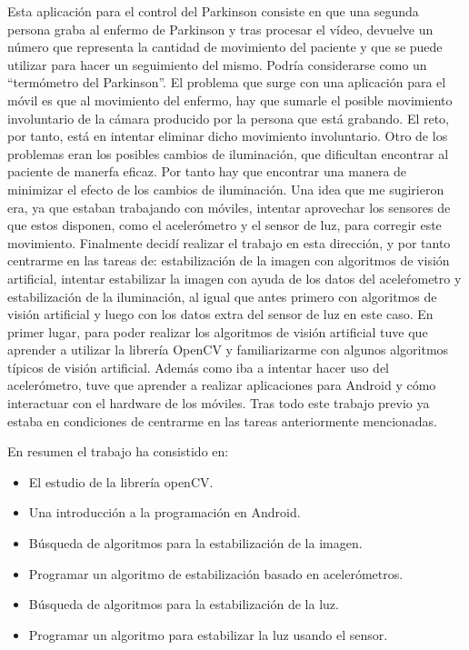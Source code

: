 \documentclass[a4paper,openright, 12pt]{book}
\begin{document}
Esta aplicación para el control del Parkinson consiste en que una segunda persona graba al enfermo de Parkinson y tras procesar el vídeo, devuelve un número que representa la cantidad de movimiento del paciente y que se puede utilizar para hacer un seguimiento del mismo. Podría considerarse como un ``termómetro del Parkinson''. El problema que surge con una aplicación para el móvil es que al movimiento del enfermo, hay que sumarle el posible movimiento involuntario de la cámara producido por la persona que está grabando. El reto, por tanto, está en intentar eliminar dicho movimiento involuntario. Otro de los problemas eran los posibles cambios de iluminación, que dificultan encontrar al paciente de manerfa eficaz. Por tanto hay que encontrar una manera de minimizar el efecto de los cambios de iluminación.
Una idea que me sugirieron era, ya que estaban trabajando con móviles, intentar aprovechar los sensores de que estos disponen, como el acelerómetro y el sensor de luz, para corregir este  movimiento.
\newpage
\thispagestyle{empty} 
Finalmente decidí realizar el trabajo en esta dirección, y por tanto centrarme en las tareas de: estabilización de la imagen con algoritmos de visión artificial, intentar estabilizar la imagen con ayuda de los datos del aceleŕometro y estabilización de la iluminación, al igual que antes primero con algoritmos de visión artificial y luego con los datos extra del sensor de luz en este caso.
En primer lugar, para poder realizar los algoritmos de visión artificial tuve que aprender a utilizar la librería OpenCV\cite{opencvrefman} y familiarizarme con algunos algoritmos típicos de visión artificial. Además como iba a intentar hacer uso del acelerómetro, tuve que aprender a realizar aplicaciones para Android y cómo interactuar con el hardware de los móviles. Tras todo este trabajo previo ya estaba en condiciones de centrarme en las tareas anteriormente mencionadas.

En resumen el trabajo ha consistido en:
\begin{itemize}
\item El estudio de la librería openCV.
\item Una introducción a la programación en Android.
\item Búsqueda de algoritmos para la estabilización de la imagen.
\item Programar un algoritmo de estabilización basado en acelerómetros.
\item Búsqueda de algoritmos para la estabilización de la luz.
\item Programar un algoritmo para estabilizar la luz usando el sensor.
\end{itemize}
\end{document}
